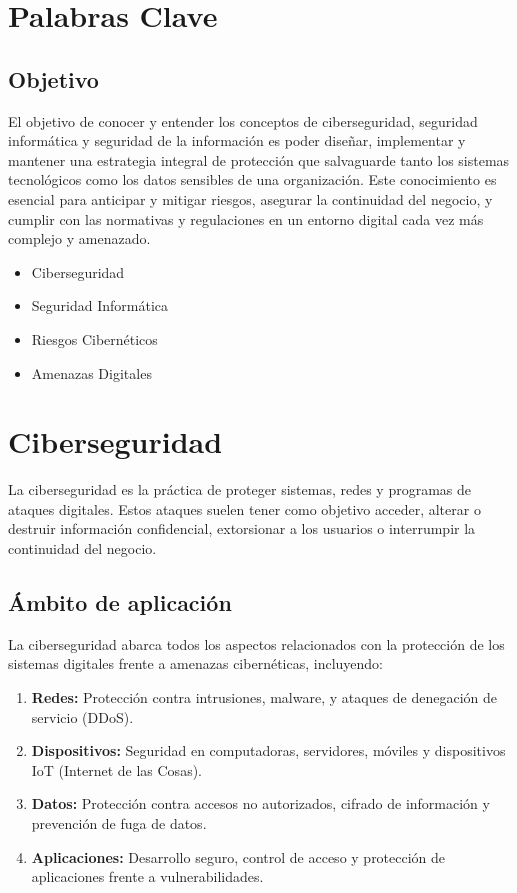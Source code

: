 \documentclass{article}
\begin{document}
\section{Palabras Clave}
\subsection{Objetivo}
El objetivo de conocer y entender los conceptos de ciberseguridad, seguridad informática y seguridad de la información es poder diseñar, implementar y mantener una estrategia integral de protección que salvaguarde tanto los sistemas tecnológicos como los datos sensibles de una organización. Este conocimiento es esencial para anticipar y mitigar riesgos, asegurar la continuidad del negocio, y cumplir con las normativas y regulaciones en un entorno digital cada vez más complejo y amenazado.
\begin{itemize}
    \item Ciberseguridad
    \item Seguridad Informática
    \item Riesgos Cibernéticos
    \item Amenazas Digitales
\end{itemize}

\section{Ciberseguridad}
\onehalfspacing
La ciberseguridad es la práctica de proteger sistemas, redes y programas de ataques digitales. Estos ataques suelen tener como objetivo acceder, alterar o destruir información confidencial, extorsionar a los usuarios o interrumpir la continuidad del negocio.

\subsection{Ámbito de aplicación}
La ciberseguridad abarca todos los aspectos relacionados con la protección de los sistemas digitales frente a amenazas cibernéticas, incluyendo:
\begin{enumerate}
    \item \textbf{Redes:} Protección contra intrusiones, malware, y ataques de denegación de servicio (DDoS).
    \item \textbf{Dispositivos:} Seguridad en computadoras, servidores, móviles y dispositivos IoT (Internet de las Cosas).
    \item \textbf{Datos:} Protección contra accesos no autorizados, cifrado de información y prevención de fuga de datos.
    \item \textbf{Aplicaciones:} Desarrollo seguro, control de acceso y protección de aplicaciones frente a vulnerabilidades.
\end{enumerate}
\end{document}
